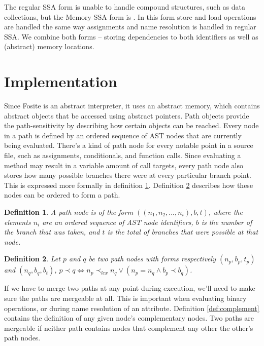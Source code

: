 \documentclass[a4paper, 11pt]{article}
\newtheorem{definition}{Definition}
\begin{document}
\begin{multicols*}{2}
The regular SSA form is unable to handle compound structures, such as data collections, but the Memory SSA form is \cite{memoryssa}. In this form store and load operations are handled the same way assignments and name resolution is handled in regular SSA. We combine both forms -- storing dependencies to both identifiers as well as (abstract) memory locations. 

\section{Implementation}

Since Fosite is an abstract interpreter, it uses an abstract memory, which contains abstract objects that be accessed using abstract pointers. Path objects provide the path-sensitivity by describing how certain objects can be reached. Every node in a path is defined by an ordered sequence of AST nodes that are currently being evaluated. There's a kind of path node for every notable point in a source file, such as assignments, conditionals, and function calls. Since evaluating a method may result in a variable amount of call targets, every path node also stores how many possible branches there were at every particular branch point. This is expressed more formally in definition \ref{def:path_node}. Definition \ref{def:path_order} describes how these nodes can be ordered to form a path. 

\begin{definition} \label{def:path_node}
A path node is of the form $((n_1, n_2, ... , n_i), b, t)$, where the elements $n_i$ are an ordered sequence of AST node identifiers, $b$ is the number of the branch that was taken, and $t$ is the total of branches that were possible at that node.
\end{definition}

\begin{definition} \label{def:path_order}
Let $p$ and $q$ be two path nodes with forms respectively $(n_p, b_p, t_p)$ and $(n_q, b_q, b_t)$, $p \prec q \iff n_p \prec_{lex} n_q \vee (n_p = n_q \wedge b_p \prec b_q )$. 
\end{definition}

If we have to merge two paths at any point during execution, we'll need to make sure the paths are mergeable at all. This is important when evaluating binary operations, or during name resolution of an attribute. Definition \ref{def:complement} contains the definition of any given node's complementary nodes. Two paths are mergeable if neither path contains nodes that complement any other the other's path nodes. 


\end{multicols*}
\end{document}
